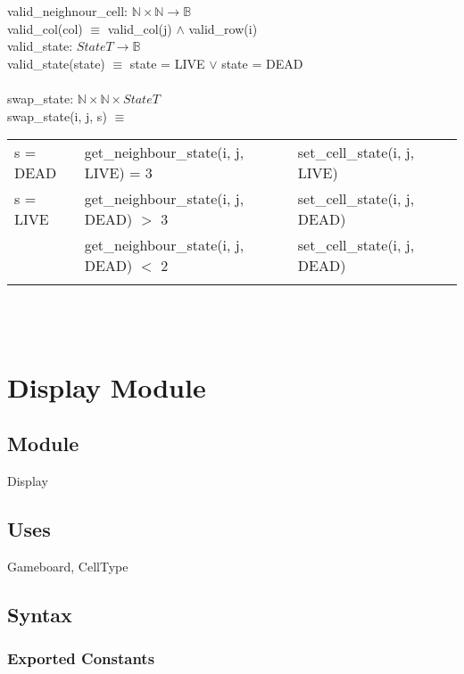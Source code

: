 \documentclass[12pt]{article}
\begin{document}
\noindent valid\_neighnour\_cell: $\mathbb{N} \times \mathbb{N} \rightarrow \mathbb{B}$ \\
valid\_col(col) $\equiv$ valid\_col(j) $\land$ valid\_row(i)\\

\noindent valid\_state: $StateT \rightarrow \mathbb{B}$ \\
valid\_state(state) $\equiv$ state = LIVE $\lor$ state = DEAD\\\\

\noindent swap\_state: $\mathbb{N} \times \mathbb{N} \times StateT$\\
\noindent swap\_state(i, j, s) $\equiv$ \\ 
\begin{tabular}{|p{3.5cm}|p{6.5cm}|l|p{4cm}|}
\hhline{|-|-|-|-|}
s = DEAD & get\_neighbour\_state(i, j, LIVE) = 3 &  set\_cell\_state(i, j, LIVE)\\
 \hhline{|-|-|-|-|}
s = LIVE & get\_neighbour\_state(i, j, DEAD) $>$ 3 & set\_cell\_state(i, j, DEAD)\\
\hhline{|~|-|-|-|}
 & get\_neighbour\_state(i, j, DEAD) $<$ 2 & set\_cell\_state(i, j, DEAD)\\
\hhline{|-|-|-|-|}
\end{tabular}\\\\

\newpage

\section* {Display Module}

\subsection* {Module}

Display

\subsection* {Uses}

Gameboard, CellType

\subsection* {Syntax}

\subsubsection* {Exported Constants}
\end{document}
